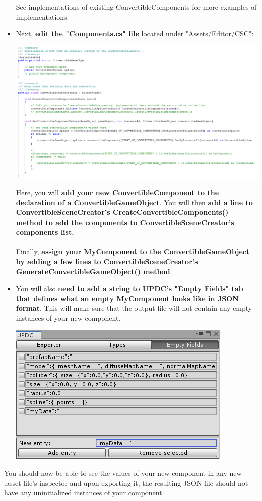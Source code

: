 \documentclass[10pt,a4paper]{article}
\begin{document}
\begin{itemize}
See implementations of existing ConvertibleComponents for more examples of implementations.
\newpage
\item Next, \textbf{edit the "Components.cs" file} located under "Assets/Editor/CSC":
\begin{center}
\includegraphics[scale=0.5]{components}
\end{center}
Here, you will \textbf{add your new ConvertibleComponent to the declaration of a ConvertibleGameObject}. You will then \textbf{add a line to ConvertibleSceneCreator's CreateConvertibleComponents() method to add the components to ConvertibleSceneCreator's components list.}\\\\
Finally, \textbf{assign your MyComponent to the ConvertibleGameObject by adding a few lines to ConvertibleSceneCreator's GenerateConvertibleGameObject() method}.
\item You will also \textbf{need to add a string to UPDC's "Empty Fields" tab that defines what an empty MyComponent looks like in JSON format}. This will make sure that the output file will not contain any empty instances of your new component.
\begin{center}
\includegraphics[scale=1.0]{emptyDefinition}
\end{center}
\end{itemize}
You should now be able to see the values of your new component in any new .asset file's inspector and upon exporting it, the resulting JSON file should not have any uninitialized instances of your component.
\end{document}
